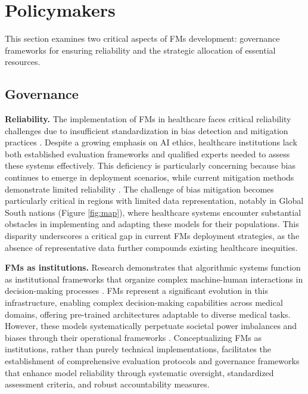 \section{Policymakers}

This section examines two critical aspects of FMs development: governance frameworks for ensuring reliability and the strategic allocation of essential resources.

\subsection{Governance}
\textbf{Reliability.} The implementation of FMs in healthcare faces critical reliability challenges due to insufficient standardization in bias detection and mitigation practices \cite{khan_how_2023, glocker_risk_2023, li_empirical_2024, jin_fairmedfm_2024, zong_medfair_2023}. Despite a growing emphasis on AI ethics, healthcare institutions lack both established evaluation frameworks and qualified experts needed to assess these systems effectively. This deficiency is particularly concerning because bias continues to emerge in deployment scenarios, while current mitigation methods demonstrate limited reliability \cite{jin_fairmedfm_2024, zong_medfair_2023}. The challenge of bias mitigation becomes particularly critical in regions with limited data representation, notably in Global South nations (Figure \ref{fig:map}), where healthcare systems encounter substantial obstacles in implementing and adapting these models for their populations. This disparity underscores a critical gap in current FMs deployment strategies, as the absence of representative data further compounds existing healthcare inequities.


\textbf{FMs as institutions.}
Research demonstrates that algorithmic systems function as institutional frameworks that organize complex machine-human interactions in decision-making processes \cite{almeida_algorithms_2022}. FMs represent a significant evolution in this infrastructure, enabling complex decision-making capabilities across medical domains, offering pre-trained architectures adaptable to diverse medical tasks. However, these models systematically perpetuate societal power imbalances and biases through their operational frameworks \cite{cottier_rising_2024}. Conceptualizing FMs as institutions, rather than purely technical implementations, facilitates the establishment of comprehensive evaluation protocols and governance frameworks that enhance model reliability through systematic oversight, standardized assessment criteria, and robust accountability measures.

